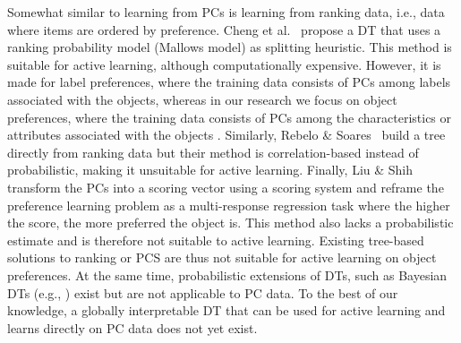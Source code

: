 \documentclass{article}
\begin{document}
Somewhat similar to learning from PCs is learning from ranking data, i.e., data where items are ordered by preference. Cheng et al.~\cite{cheng_decision_2009} propose a DT that uses a ranking probability model (Mallows model) as splitting heuristic. This method is suitable for active learning, although computationally expensive. However, it is made for label preferences, where the training data consists of PCs among labels associated with the objects, whereas in our research we focus on object preferences, where the training data consists of PCs among the characteristics or attributes associated with the objects \cite{benavoli2024tutorial}.
Similarly, Rebelo \& Soares~\cite{rebelo_empirical_2008} build a tree directly from ranking data but their method is correlation-based instead of probabilistic, making it unsuitable for active learning. Finally, Liu \& Shih~\cite{liu_score-scale_2016} transform the PCs into a scoring vector using a scoring system and reframe the preference learning problem as a multi-response regression task where the higher the score, the more preferred the object is. This method also lacks a probabilistic estimate and is therefore not suitable to active learning.
Existing tree-based solutions to ranking or PCS are thus not suitable for active learning on object preferences. At the same time, probabilistic extensions of DTs, such as Bayesian DTs (e.g., \cite{Chipman01091998, nuti_explainable_2021}) exist but are not applicable to PC data. To the best of our knowledge, a globally interpretable DT that can be used for active learning and learns directly on PC data does not yet exist.
\end{document}
